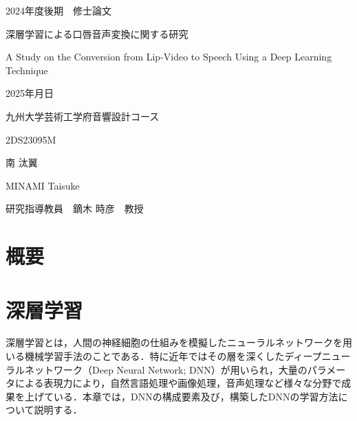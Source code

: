 \documentclass[12pt]{jarticle}
\numberwithin{equation}{section}    %
\numberwithin{figure}{section}      %
\numberwithin{table}{section}      %
\begin{document}
\begin{titlepage}
    \begin{center}
        {\Large 2024年度後期　修士論文}
        \vspace{120truept}

        {\huge 深層学習による口唇音声変換に関する研究}
        \vspace{30truept}

        {\huge A Study on the Conversion from Lip-Video to Speech Using a Deep Learning Technique}
        \vspace{120truept}

        {\Large 2025年月日}
        \vspace{10truept}

        {\Large 九州大学芸術工学府音響設計コース}
        \vspace{70truept}

        {\Large 2DS23095M}
        \vspace{10truept}

        {\Large 南 汰翼}
        \vspace{10truept}

        {\Large MINAMI Taisuke}
        \vspace{30truept}

        {\Large 研究指導教員　鏑木 時彦　教授}
    \end{center}
\end{titlepage}

\section*{概要}
\thispagestyle{empty}
\clearpage

\setcounter{tocdepth}{3}
\tableofcontents
\thispagestyle{empty}
\clearpage

\pagestyle{plain}
\setcounter{page}{1}


\clearpage


\clearpage

\section{深層学習}
深層学習とは，人間の神経細胞の仕組みを模擬したニューラルネットワークを用いる機械学習手法のことである．特に近年ではその層を深くしたディープニューラルネットワーク（Deep Neural Network; DNN）が用いられ，大量のパラメータによる表現力により，自然言語処理や画像処理，音声処理など様々な分野で成果を上げている．本章では，DNNの構成要素及び，構築したDNNの学習方法について説明する．


\end{document}

